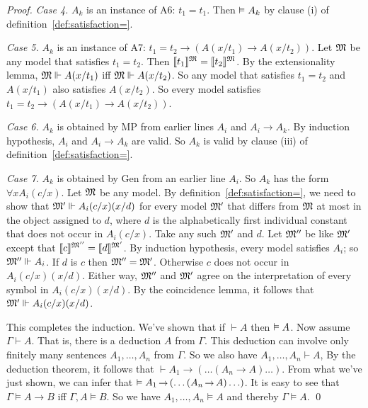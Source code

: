 \begin{proof}
  \textit{Case 4.} $A_{k}$ is an instance of A6: $t_1=t_1$.
  Then $\vDash A_{k}$ by clause (i) of definition~\ref{def:satisfaction=}.

  \textit{Case 5.} $A_{k}$ is an instance of A7: $t_1=t_2\to(A(x/t_1)\to A(x/t_2))$.
  Let $\mathfrak{M}$ be any model that satisfies $t_1=t_2$.
  Then $\llbracket t_1 \rrbracket^{\mathfrak{M}} = \llbracket t_2 \rrbracket^{\mathfrak{M}}$.
  By the extensionality lemma,
  $\mathfrak{M} \Vdash A(x/t_1)$ iff $\mathfrak{M} \Vdash A(x/t_2)$.
  So any model that satisfies $t_1=t_2$ and $A(x/t_1)$ also satisfies $A(x/t_2)$.
  So every model satisfies $t_1=t_2\to(A(x/t_1)\to A(x/t_2))$.

  \textit{Case 6.} $A_{k}$ is obtained by MP from earlier lines $A_{i}$ and $A_{i}\to A_{k}$.
  By induction hypothesis, $A_{i}$ and $A_{i}\to A_{k}$ are valid.
  So $A_{k}$ is valid by clause (iii) of definition~\ref{def:satisfaction=}.

  \textit{Case 7.} $A_{k}$ is obtained by Gen from an earlier line $A_i$.
  So $A_k$ has the form $\forall x A_i(c/x)$.
  Let $\mathfrak{M}$ be any model.
  By definition~\ref{def:satisfaction=},
  we need to show that
  $\mathfrak{M}' \Vdash A_i(c/x)(x/d)$ for every model $\mathfrak{M}'$ that differs from $\mathfrak{M}$ at most in the object assigned to $d$,
  where $d$ is the alphabetically first individual constant that does not occur in $A_i(c/x)$.
  Take any such $\mathfrak{M}'$ and $d$.
  Let $\mathfrak{M}''$ be like $\mathfrak{M}'$
  except that $\llbracket c \rrbracket^{\mathfrak{M}''} = \llbracket d \rrbracket^{\mathfrak{M}'}$.
  By induction hypothesis,
  every model satisfies $A_i$;
  so $\mathfrak{M}'' \Vdash A_i$.
  If $d$ is $c$ then $\mathfrak{M}'' = \mathfrak{M}'$.
  Otherwise $c$ does not occur in $A_i(c/x)(x/d)$.
  Either way,
  $\mathfrak{M}''$ and $\mathfrak{M}'$ agree on the interpretation of
  every symbol in $A_i(c/x)(x/d)$.
  By the coincidence lemma,
  it follows that
  $\mathfrak{M}' \Vdash A_i(c/x)(x/d)$.

  This completes the induction.
  We've shown that if $\vdash A$ then $\vDash A$.
  Now assume $\Gamma \vdash A$.
  That is,
  there is a deduction $A$ from $\Gamma$.
  This deduction can involve only finitely many sentences $A_{1},\ldots,A_{n}$ from $\Gamma$.
  So we also have $A_{1},\ldots,A_{n} \vdash A$,
  By the deduction theorem, it follows that
  $\vdash A_{1} \to (\ldots (A_{n} \to A) \ldots)$.
  From what we've just shown,
  we can infer that
  $\entails A_{1} \to (\ldots (A_{n} \to A) \ldots)$.
  It is easy to see that
  $\Gamma \models A \to B$ iff $\Gamma,A \models B$.
  So we have $A_{1},\ldots,A_{n} \models A$
  and thereby $\Gamma \models A$.
  \qed
\end{proof}

